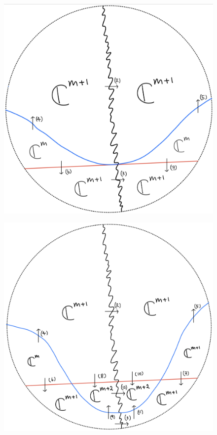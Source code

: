 \begin{figure}[H]
    \centering
    \includegraphics[scale = 0.95]{diagrams/lemma1/29.png} 
    \caption{}
    \label{fig:your-label}
\end{figure}
\begin{figure}[H]
    \centering
    \includegraphics[scale = 0.95]{diagrams/lemma1/30.png} 
    \caption{}
    \label{fig:your-label}
\end{figure}
